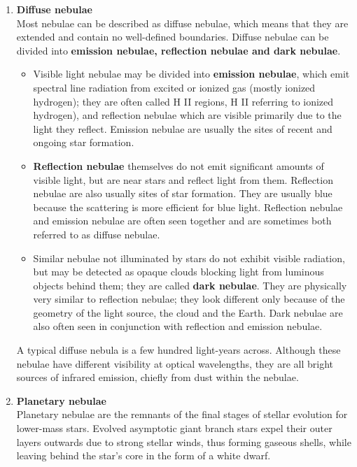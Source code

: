 \documentclass{article}
\begin{document}
\begin{enumerate}
    \item \textbf{Diffuse nebulae}\\
    Most nebulae can be described as diffuse nebulae, which means that they are extended and contain no well-defined boundaries. Diffuse nebulae can be divided into \textbf{emission nebulae, reflection nebulae and dark nebulae}.
    
    \begin{itemize}
        \item Visible light nebulae may be divided into \textbf{emission nebulae}, which emit spectral line radiation from excited or ionized gas (mostly ionized hydrogen); they are often called H II regions, H II referring to ionized hydrogen), and reflection nebulae which are visible primarily due to the light they reflect. Emission nebulae are usually the sites of recent and ongoing star formation.
        \item \textbf{Reflection nebulae} themselves do not emit significant amounts of visible light, but are near stars and reflect light from them. Reflection nebulae are also usually sites of star formation. They are usually blue because the scattering is more efficient for blue light. Reflection nebulae and emission nebulae are often seen together and are sometimes both referred to as diffuse nebulae.
        \item Similar nebulae not illuminated by stars do not exhibit visible radiation, but may be detected as opaque clouds blocking light from luminous objects behind them; they are called \textbf{dark nebulae}. They are physically very similar to reflection nebulae; they look different only because of the geometry of the light source, the cloud and the Earth. Dark nebulae are also often seen in conjunction with reflection and emission nebulae. 
    \end{itemize}
    A typical diffuse nebula is a few hundred light-years across. Although these nebulae have different visibility at optical wavelengths, they are all bright sources of infrared emission, chiefly from dust within the nebulae.
    
    \item \textbf{Planetary nebulae}\\
    Planetary nebulae are the remnants of the final stages of stellar evolution for lower-mass stars. Evolved asymptotic giant branch stars expel their outer layers outwards due to strong stellar winds, thus forming gaseous shells, while leaving behind the star's core in the form of a white dwarf. 
    

\end{enumerate}
\end{document}
